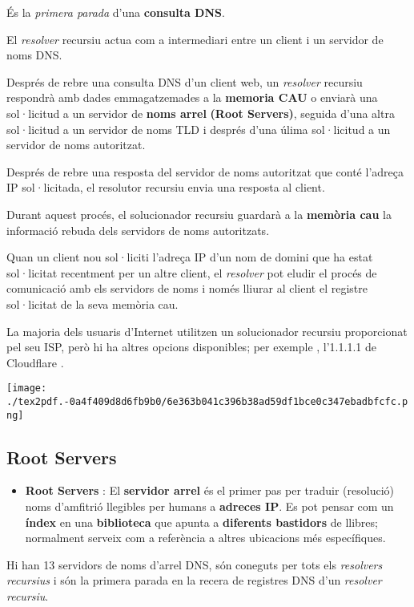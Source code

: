 \documentclass[]{article}
\providecommand{\tightlist}{%
  \setlength{\itemsep}{0pt}\setlength{\parskip}{0pt}}
\begin{document}
És la \emph{primera parada} d'una \textbf{consulta DNS}.

El \emph{resolver} recursiu actua com a intermediari entre un client i
un servidor de noms DNS.

Després de rebre una consulta DNS d'un client web, un \emph{resolver}
recursiu respondrà amb dades emmagatzemades a la \textbf{memoria CAU} o
enviarà una sol·licitud a un servidor de \textbf{noms arrel}
\textbf{(Root Servers)}, seguida d'una altra sol·licitud a un servidor
de noms TLD i després d'una úlima sol·licitud a un servidor de noms
autoritzat.

Després de rebre una resposta del servidor de noms autoritzat que conté
l'adreça IP sol·licitada, el resolutor recursiu envia una resposta al
client.

Durant aquest procés, el solucionador recursiu guardarà a la
\textbf{memòria cau} la informació rebuda dels servidors de noms
autoritzats.

Quan un client nou sol·liciti l'adreça IP d'un nom de domini que ha
estat sol·licitat recentment per un altre client, el \emph{resolver} pot
eludir el procés de comunicació amb els servidors de noms i només
lliurar al client el registre sol·licitat de la seva memòria cau.

La majoria dels usuaris d'Internet utilitzen un solucionador recursiu
proporcionat pel seu ISP, però hi ha altres opcions disponibles; per
exemple , l'1.1.1.1 de Cloudflare .

\texttt{[image: ./tex2pdf.-0a4f409d8d6fb9b0/6e363b041c396b38ad59df1bce0c347ebadbfcfc.png]}

\hypertarget{root-servers}{%
\subsection{\texorpdfstring{\textbf{Root
Servers}}{Root Servers}}\label{root-servers}}

\begin{itemize}
\tightlist
\item
  \textbf{Root Servers} : El \textbf{servidor arrel} és el primer pas
  per traduir (resolució) noms d'amfitrió llegibles per humans a
  \textbf{adreces IP}. Es pot pensar com un \textbf{índex} en una
  \textbf{biblioteca} que apunta a \textbf{diferents bastidors} de
  llibres; normalment serveix com a referència a altres ubicacions més
  específiques.
\end{itemize}

Hi han 13 servidors de noms d'arrel DNS, són coneguts per tots els
\emph{resolvers recursius} i són la primera parada en la recera de
registres DNS d'un \emph{resolver recursiu}.
\end{document}

